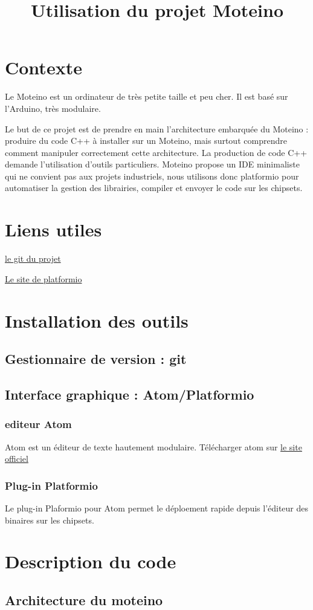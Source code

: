 \documentclass{report}
\title{Utilisation du projet Moteino}
\begin{document}
\chapter{Contexte}

Le Moteino est un ordinateur de très petite taille et peu cher. Il est basé sur l'Arduino, très modulaire. 

Le but de ce projet est de prendre en main l'architecture embarquée du Moteino : produire du code C++ à installer sur un Moteino, mais surtout comprendre comment manipuler correctement cette architecture.
La production de code C++ demande l'utilisation d'outils particuliers. Moteino propose un IDE minimaliste qui ne convient pas aux projets industriels, nous utilisons donc platformio pour automatiser la gestion des librairies, compiler et envoyer le code sur les chipsets.

\chapter{Liens utiles}

\href{https://github.com/glelouet/arduino}{le git du projet}

\href{http://platformio.org/}{Le site de platformio}

\chapter{Installation des outils}

\section{Gestionnaire de version : git}

\section{Interface graphique : Atom/Platformio}

\subsection{editeur Atom}

Atom est un éditeur de texte hautement modulaire.
Télécharger atom sur \href{https://atom.io/}{le site officiel}

\subsection{Plug-in Platformio}

Le plug-in Plaformio pour Atom permet le déploement rapide depuis l'éditeur des binaires sur les chipsets.

\chapter{Description du code}

\section{Architecture du moteino}

\section{}
\end{document}
